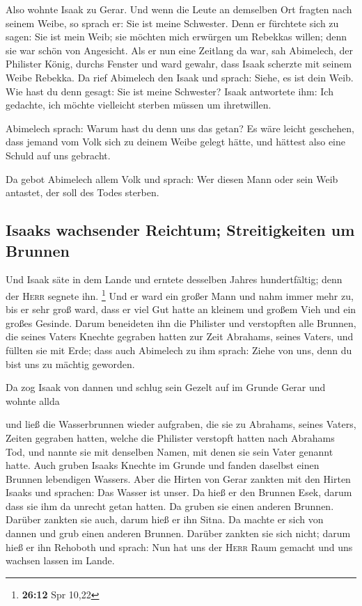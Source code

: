  Also wohnte Isaak zu Gerar.  Und wenn die
Leute an demselben Ort fragten nach seinem Weibe, so sprach er: Sie ist
meine Schwester. Denn er fürchtete sich zu sagen: Sie ist mein Weib; sie
möchten mich erwürgen um Rebekkas willen; denn sie war schön von
Angesicht.  Als er nun eine Zeitlang da war, sah
Abimelech, der Philister König, durchs Fenster und ward gewahr, dass
Isaak scherzte mit seinem Weibe Rebekka.  Da rief
Abimelech den Isaak und sprach: Siehe, es ist dein Weib. Wie hast du
denn gesagt: Sie ist meine Schwester? Isaak antwortete ihm: Ich
gedachte, ich möchte vielleicht sterben müssen um ihretwillen.

 Abimelech sprach: Warum hast du denn uns das getan? Es
wäre leicht geschehen, dass jemand vom Volk sich zu deinem Weibe gelegt
hätte, und hättest also eine Schuld auf uns gebracht.

 Da gebot Abimelech allem Volk und sprach: Wer diesen
Mann oder sein Weib antastet, der soll des Todes sterben.

\hypertarget{isaaks-wachsender-reichtum-streitigkeiten-um-brunnen}{%
\subsection{Isaaks wachsender Reichtum; Streitigkeiten um
Brunnen}\label{isaaks-wachsender-reichtum-streitigkeiten-um-brunnen}}

 Und Isaak säte in dem Lande und erntete desselben Jahres
hundertfältig; denn der \textsc{Herr} segnete ihn. \footnote{\textbf{26:12}
  Spr 10,22}  Und er ward ein großer Mann und nahm immer
mehr zu, bis er sehr groß ward,  dass er viel Gut hatte
an kleinem und großem Vieh und ein großes Gesinde. Darum beneideten ihn
die Philister  und verstopften alle Brunnen, die seines
Vaters Knechte gegraben hatten zur Zeit Abrahams, seines Vaters, und
füllten sie mit Erde;  dass auch Abimelech zu ihm sprach:
Ziehe von uns, denn du bist uns zu mächtig geworden.

 Da zog Isaak von dannen und schlug sein Gezelt auf im
Grunde Gerar und wohnte allda

 und ließ die Wasserbrunnen wieder aufgraben, die sie zu
Abrahams, seines Vaters, Zeiten gegraben hatten, welche die Philister
verstopft hatten nach Abrahams Tod, und nannte sie mit denselben Namen,
mit denen sie sein Vater genannt hatte.  Auch gruben
Isaaks Knechte im Grunde und fanden daselbst einen Brunnen lebendigen
Wassers.  Aber die Hirten von Gerar zankten mit den
Hirten Isaaks und sprachen: Das Wasser ist unser. Da hieß er den Brunnen
Esek, darum dass sie ihm da unrecht getan hatten.  Da
gruben sie einen anderen Brunnen. Darüber zankten sie auch, darum hieß
er ihn Sitna.  Da machte er sich von dannen und grub
einen anderen Brunnen. Darüber zankten sie sich nicht; darum hieß er ihn
Rehoboth und sprach: Nun hat uns der \textsc{Herr} Raum gemacht und uns
wachsen lassen im Lande.

